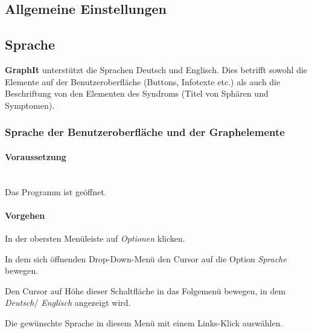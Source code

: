\documentclass[enabledeprecatedfontcommands,fontsize=11pt,paper=a4,twoside]{scrartcl}
\newcounter{one}
\newcommand*{\condition}{\paragraph{Voraussetzung}$\;$ \vspace{0.2cm}\\}
\newcommand*{\action}{\paragraph{Vorgehen}}
\let\origenumerate\enumerate
\let\origendenumerate\endenumerate
\renewenvironment{enumerate}{\origenumerate \addtolength{\itemsep}{-10.0pt}}{\origendenumerate}
\begin{document}
 		\begin{figure}[ht!]
 			\centering
 			
 		\end{figure}
		
\subsection{Allgemeine Einstellungen} \label{settings}
	
\subsection{Sprache}
\textbf{GraphIt} unterstützt die Sprachen Deutsch und Englisch. Dies betrifft sowohl die Elemente auf der Benutzeroberfläche (Buttons, Infotexte etc.) als auch die Beschriftung von den Elementen des Syndroms (Titel von Sphären und Symptomen).\\
	
\newpage
\subsubsection{Sprache der Benutzeroberfläche und der Graphelemente}
		\condition 	
		Das Programm ist geöffnet.
		\action
		\begin{enumerate}
				\item In der obersten Menüleiste auf \textit{Optionen} klicken. 
				\item In dem sich öffnenden Drop-Down-Menü den Cursor auf die Option \textit{Sprache} bewegen.
				\item Den Cursor auf Höhe dieser Schaltfläche in das Folgemenü bewegen, in dem \textit{Deutsch}/ \textit{Englisch} angezeigt wird.
				\item Die gewünschte Sprache in diesem Menü mit einem Links-Klick auswählen.\\
		\end{enumerate}
\end{document}
